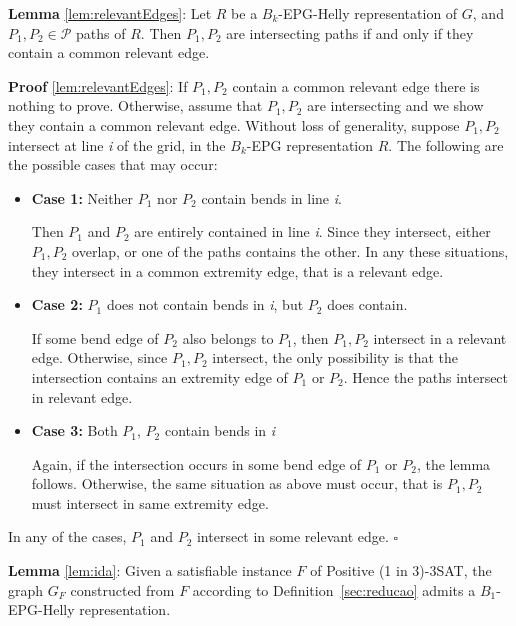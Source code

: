 \documentclass[9pt]{entcs}
\begin{document}
\begin{lema*}
\textbf{Lemma} \ref{lem:relevantEdges}:
Let $R$ be a $B_k$-EPG-Helly representation of $G$, and $P_1, P_2 \in \mathcal{P}$ paths of $R$. Then $P_1, P_2$ are intersecting paths if and only if they contain a common relevant edge.
\end{lema*}


\begin{prove*}
\textbf{Proof} \ref{lem:relevantEdges}: If $P_1, P_2$ contain a common relevant edge there is nothing to prove. Otherwise, assume that $P_1, P_2$ are intersecting and we show they contain a common relevant edge. Without loss of generality, suppose $P_1, P_2$ intersect at line \textit{i} of the grid, in the  $B_k$-EPG representation $R$. The following are the possible cases that may occur:

\begin{itemize}
\item \textbf{Case 1:} Neither $P_1$ nor $P_2$ contain bends in line \textit{i}. 

Then $P_1$ and $ P_2$  are entirely contained in line \textit{i}. Since they intersect, either $P_1, P_2$  overlap, or one of the paths contains the other. In any these situations, they intersect in a common extremity edge, that is a relevant edge.

\item \textbf{Case 2:} $P_1$ does not contain bends in \textit{i}, but $ P_2$ does contain.

If some bend edge of $P_2$ also belongs to $P_1$, then $P_1, P_2$  intersect in  a relevant edge. Otherwise, since $P_1, P_2$  intersect, the only possibility is that the intersection contains an extremity edge of $P_1$ or $ P_2$. Hence the paths intersect in relevant edge.  

\item \textbf{Case 3:} Both $P_1$,  $P_2$ contain bends in \textit{i}

Again, if the intersection occurs in some bend edge of $P_1$  or $P_2$, the lemma follows. Otherwise, the same situation as above must occur, that is $P_1, P_2$  must intersect in same extremity edge.
 
\end{itemize}
In any of the cases, $P_1$ and $P_2$ intersect in some relevant edge.
$\square$ \end{prove*}


\begin{lema*}\textbf{Lemma} \ref{lem:ida}:
Given a satisfiable instance $F$ of {\sc Positive (1 in 3)-3SAT}, the graph $G_F$ constructed from $F$ according to Definition~\ref{sec:reducao} admits a $B_{1}$-EPG-Helly representation.
\end{lema*}
\end{document}
